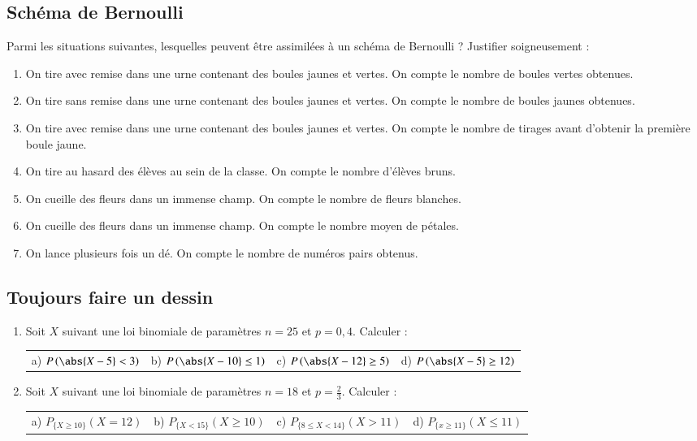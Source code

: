 \documentclass[oneside,12pt]{article}          %
\begin{document}
\subsection{Schéma de Bernoulli}
Parmi les situations suivantes, lesquelles peuvent être assimilées à un schéma de Bernoulli ? Justifier soigneusement :
\begin{enumerate}
	\item On tire avec remise dans une urne contenant des boules jaunes et vertes. On compte le nombre de boules vertes obtenues.
	\item On tire sans remise dans une urne contenant des boules jaunes et vertes. On compte le nombre de boules jaunes obtenues.
	\item On tire avec remise dans une urne contenant des boules jaunes et vertes. On compte le nombre de tirages avant d'obtenir la première boule jaune.
	\item On tire au hasard des élèves au sein de la classe. On compte le nombre d'élèves bruns.
	\item On cueille des fleurs dans un immense champ. On compte le nombre de fleurs blanches.
	\item On cueille des fleurs dans un immense champ. On compte le nombre moyen de pétales.
	\item On lance plusieurs fois un dé. On compte le nombre de numéros pairs obtenus.
\end{enumerate}



\subsection{Toujours faire un dessin}
\begin{enumerate}
    \item Soit $X$ suivant une loi binomiale de paramètres $n=25$ et $p=0,4$. Calculer :\\
    \begin{tabular}{p{} p{} p{} p{}}
        a) $P\left(\abs{X-5}<3\right)$ & b) $P\left(\abs{X-10}\leq1\right)$ & c) $P\left(\abs{X-12}\geq5\right)$ & d) $P\left(\abs{X-5}\geq12\right)$ 
    \end{tabular}
    \item Soit $X$ suivant une loi binomiale de paramètres $n=18$ et $p=\frac{2}{3}$. Calculer :\\    
    \begin{tabular}{p{} p{} p{} p{}}
        a) $P_{\{X\geq10\}}(X=12)$ & b) $P_{\{X<15\}}(X\geq10)$ & c) $P_{\{8\leq X<14\}}(X>11)$ & d) $P_{\{x\geq11\}}(X\leq11)$ 
    \end{tabular}
\end{enumerate}
\end{document}
